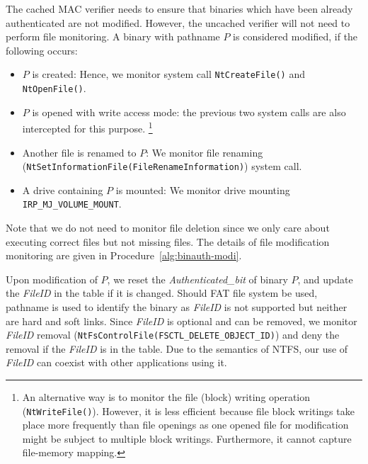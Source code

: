 The cached MAC verifier needs to ensure that binaries which have
been already authenticated are not modified.
However, the uncached verifier will not need to perform file monitoring.
A binary with pathname $P$ is considered modified, if the following occurs:
\begin{itemize}
\item $P$ is created: Hence, we monitor system call
{\tt NtCreateFile()} and {\tt NtOpenFile()}.
\item $P$ is opened with write access mode: the previous two
system calls are also intercepted for this purpose.
\footnote{An alternative way is to monitor the file (block) writing operation ({\tt NtWriteFile()}).
However, it is less efficient because file block writings take place more frequently
than file openings as one opened file for modification might be subject to 
multiple block writings. Furthermore, it cannot capture file-memory mapping.}
\item Another file is renamed to $P$: 
We monitor file renaming ({\tt NtSetInformationFile\linebreak[0](\linebreak[0]FileRenameInformation\linebreak[0])})
system call.
\item A drive containing $P$ is mounted:
We monitor drive mounting {\tt IRP\_MJ\_VOLUME\_MOUNT}.
\end{itemize}

Note that we do not need to monitor file deletion since we only care about
executing correct files but not missing files.
The details of file modification monitoring are given in Procedure~\ref{alg:binauth-modi}.

Upon modification of $P$, we reset the {\it Authenticated\_bit} of binary $P$, 
and update the {\it FileID} in the table if it is changed.
Should FAT file system be used, pathname is used 
to identify the binary as {\it FileID} is not supported but
neither are hard and soft links.
Since {\it FileID} is optional and can be removed,
we monitor {\it FileID} removal ({\tt NtFsControlFile(FSCTL\_DELETE\_OBJECT\_ID)})
and deny the removal if the {\it FileID} is in the table.
Due to the semantics of NTFS, our use of {\it FileID} can
coexist with other applications using it.


